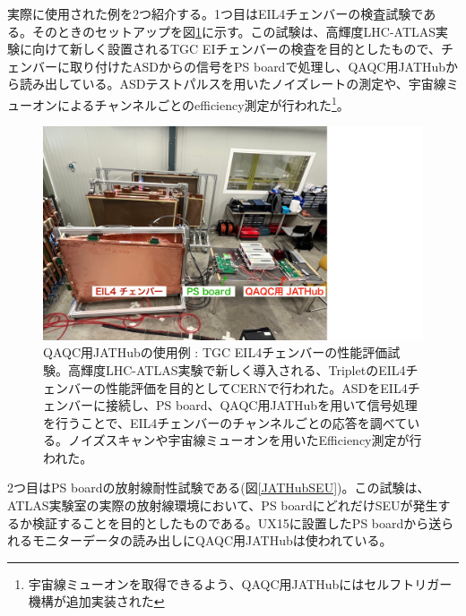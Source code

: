 実際に使用された例を2つ紹介する。1つ目はEIL4チェンバーの検査試験である。そのときのセットアップを図\ref{JATHubEIL4}に示す。この試験は、高輝度LHC-ATLAS実験に向けて新しく設置されるTGC EIチェンバーの検査を目的としたもので、チェンバーに取り付けたASDからの信号をPS boardで処理し、QAQC用JATHubから読み出している。ASDテストパルスを用いたノイズレートの測定や、宇宙線ミューオンによるチャンネルごとのefficiency測定が行われた\footnote{宇宙線ミューオンを取得できるよう、QAQC用JATHubにはセルフトリガー機構が追加実装された}。

\begin{figure}
\centering
\includegraphics[width=16cm]{fig/QAQC/JATHubEIL4.pdf}
\caption[QAQC用JATHubの使用例 : EIL4チェンバー試験]{QAQC用JATHubの使用例 : TGC EIL4チェンバーの性能評価試験\cite{mt_wada}。高輝度LHC-ATLAS実験で新しく導入される、TripletのEIL4チェンバーの性能評価を目的としてCERNで行われた。ASDをEIL4チェンバーに接続し、PS board、QAQC用JATHubを用いて信号処理を行うことで、EIL4チェンバーのチャンネルごとの応答を調べている。ノイズスキャンや宇宙線ミューオンを用いたEfficiency測定が行われた。}
\label{JATHubEIL4}
\end{figure}

2つ目はPS boardの放射線耐性試験である(図\ref{JATHubSEU})。この試験は、ATLAS実験室の実際の放射線環境において、PS boardにどれだけSEUが発生するか検証することを目的としたものである。UX15に設置したPS boardから送られるモニターデータの読み出しにQAQC用JATHubは使われている。

